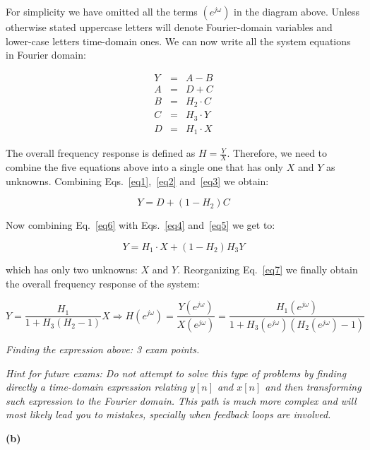 \documentclass[a4paper,11pt,oneside]{article}
\begin{document}
For simplicity we have omitted all the terms $(e^{j\omega})$ in the diagram above. Unless otherwise stated uppercase letters will denote Fourier-domain variables and lower-case letters time-domain ones. We can now write all the system equations in Fourier domain:

\begin{eqnarray}
Y &=& A-B\label{eq1}\\
A &=& D+C\label{eq2}\\
B &=& H_2\cdot C\label{eq3}\\
C&=&H_3\cdot Y\label{eq4}\\
D&=&H_1 \cdot X\label{eq5}
\end{eqnarray}

The overall frequency response is defined as $H=\frac{Y}{X}$. Therefore, we need to combine the five equations above into a single one that has only $X$ and $Y$ as unknowns. Combining Eqs.~\ref{eq1},~\ref{eq2} and~\ref{eq3} we obtain:

\begin{equation}\label{eq6}
Y = D + (1-H_2)C
\end{equation}

Now combining Eq.~\ref{eq6} with Eqs.~\ref{eq4} and~\ref{eq5} we get to:

\begin{equation}\label{eq7}
Y = H_1\cdot X + (1-H_2)H_3 Y
\end{equation}

which has only two unknowns: $X$ and $Y$. Reorganizing Eq.~\ref{eq7} we finally obtain the overall frequency response of the system:

\begin{equation}
Y = \frac{H_1}{1+H_3(H_2-1)}X \Rightarrow H(e^{j\omega})=\frac{Y(e^{j\omega})}{X(e^{j\omega})}=\frac{H_1(e^{j\omega})}{1+H_3(e^{j\omega})(H_2(e^{j\omega})-1)}
\end{equation}

\emph{Finding the expression above: 3 exam points.}

\emph{Hint for future exams: Do not attempt to solve this type of problems by finding directly a time-domain expression relating $y[n]$ and $x[n]$ and then transforming such expression to the Fourier domain. This path is much more complex and will most likely lead you to mistakes, specially when feedback loops are involved. }

\vspace{1cm}

\textbf{(b)}
\end{document}
